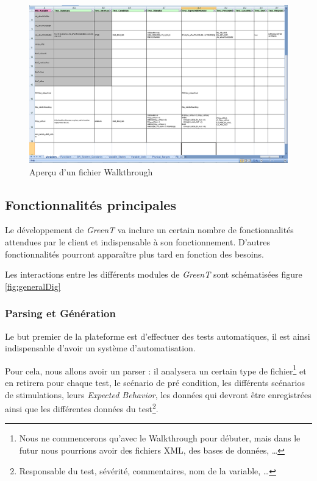 		\begin{figure}[H]
			\centering
			\includegraphics[width=18.5cm]{contents/images/walkthrough.png}
			\caption{Aperçu d'un fichier Walkthrough}
		\end{figure}

	\subsection{Fonctionnalités principales}
	Le développement de \textit{GreenT} va inclure un certain nombre de fonctionnalités attendues par le client et indispensable à son fonctionnement. D'autres fonctionnalités pourront apparaître plus tard en fonction des besoins.

	Les interactions entre les différents modules de \textit{GreenT} sont schématisées figure \ref{fig:generalDig}

	\subsubsection{Parsing et Génération}\label{generation}
	Le but premier de la plateforme est d'effectuer des tests automatiques, il est ainsi indispensable d'avoir un système d'automatisation.

	Pour cela, nous allons avoir un parser : il analysera un certain type de fichier\footnote{Nous ne commencerons qu'avec le Walkthrough pour débuter, mais dans le futur nous pourrions avoir des fichiers XML, des bases de données, \ldots} et en retirera pour chaque test, le scénario de pré condition, les différents scénarios de stimulations, leurs \textit{Expected Behavior}, les données qui devront être enregistrées ainsi que les différentes données du test\footnote{Responsable du test, sévérité, commentaires, nom de la variable, \ldots}.

